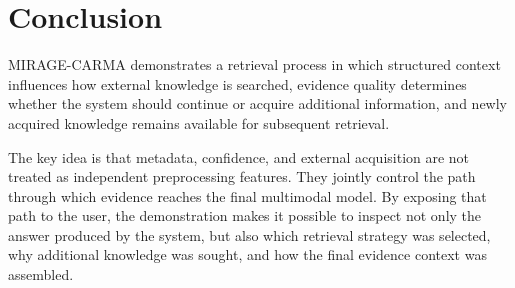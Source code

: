 \documentclass[runningheads]{llncs}
\begin{document}
\section{Conclusion}

MIRAGE-CARMA demonstrates a retrieval process in which structured context influences how external knowledge is searched, evidence quality determines whether the system should continue or acquire additional information, and newly acquired knowledge remains available for subsequent retrieval.

The key idea is that metadata, confidence, and external acquisition are not treated as independent preprocessing features. They jointly control the path through which evidence reaches the final multimodal model. By exposing that path to the user, the demonstration makes it possible to inspect not only the answer produced by the system, but also which retrieval strategy was selected, why additional knowledge was sought, and how the final evidence context was assembled.



\end{document}
